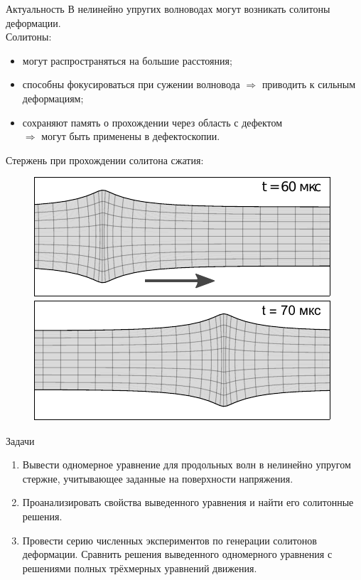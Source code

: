 \documentclass[usenames,dvipsnames]{beamer}
\begin{document}
\begin{frame}{Актуальность}
	В нелинейно упругих волноводах могут возникать солитоны деформации.\\
	\vspace{2mm}
	Солитоны:
	\begin{itemize}
		\item могут распространяться на большие расстояния;
		\item способны фокусироваться при сужении волновода $\Rightarrow$ приводить к сильным деформациям;
		\item сохраняют память о прохождении через область с дефектом\\ $\Rightarrow$ могут быть применены в дефектоскопии.
	\end{itemize}
	\vspace{2mm}
	Стержень при прохождении солитона сжатия:
	\begin{figure}
		\vspace{-2mm}
		\includegraphics[width=0.46\linewidth]{Figures/DeformedRod1}
		\hspace{5mm}
		\includegraphics[width=0.46\linewidth]{Figures/DeformedRod2}
	\end{figure}
\end{frame}

 
\begin{frame}{Задачи}
\begin{enumerate}
	\item Вывести одномерное уравнение для продольных волн в нелинейно упругом стержне, учитывающее заданные на поверхности напряжения.
	\item Проанализировать свойства выведенного уравнения и найти его солитонные решения. 
	\item Провести серию численных экспериментов по генерации солитонов деформации. Сравнить решения выведенного одномерного уравнения с решениями полных трёхмерных уравнений движения.
\end{enumerate}
\end{frame}
\end{document}
